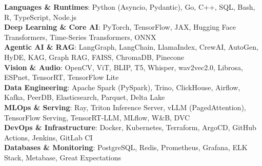\begin{itemize}[leftmargin=0.15in, label={}]
  \small{\item{
    \textbf{Languages \& Runtimes}{: Python (Asyncio, Pydantic), Go, C++, SQL, Bash, R, TypeScript, Node.js} \\
    \textbf{Deep Learning \& Core AI}{: PyTorch, TensorFlow, JAX, Hugging Face Transformers, Time-Series Transformers, ONNX} \\
    \textbf{Agentic AI \& RAG}{: LangGraph, LangChain, LlamaIndex, CrewAI, AutoGen, HyDE, KAG, Graph RAG, FAISS, ChromaDB, Pinecone} \\
    \textbf{Vision \& Audio}{: OpenCV, ViT, BLIP, T5, Whisper, wav2vec2.0, Librosa, ESPnet, TensorRT, TensorFlow Lite} \\
    \textbf{Data Engineering}{: Apache Spark (PySpark), Trino, ClickHouse, Airflow, Kafka, PeerDB, Elasticsearch, Parquet, Delta Lake} \\
    \textbf{MLOps \& Serving}{: Ray, Triton Inference Server, vLLM (PagedAttention), TensorFlow Serving, TensorRT-LLM, MLflow, W\&B, DVC} \\
    \textbf{DevOps \& Infrastructure}{: Docker, Kubernetes, Terraform, ArgoCD, GitHub Actions, Jenkins, GitLab CI} \\
    \textbf{Databases \& Monitoring}{: PostgreSQL, Redis, Prometheus, Grafana, ELK Stack, Metabase, Great Expectations}
  }}
\end{itemize}
